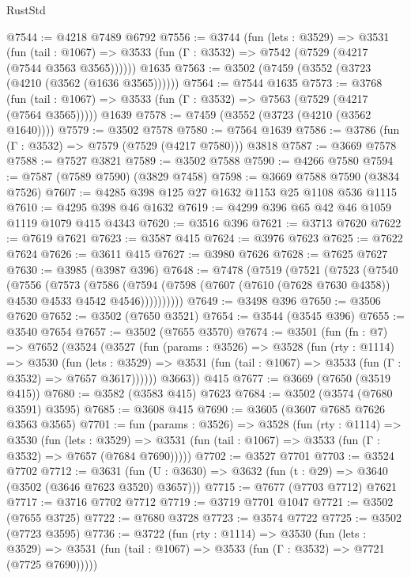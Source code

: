 \begin{lexlean}{RustStd}
\begin{coremodule}
@7544 := @4218 @7489 @6792
@7556 := @3744
    (fun (lets : @3529) =>
    @3531
      (fun (tail : @1067) => @3533 (fun (Γ : @3532) => @7542 (@7529 (@4217 (@7544 @3563 @3565))))))
    @1635
@7563 := @3502 (@7459 (@3552 (@3723 (@4210 (@3562 (@1636 @3565))))))
@7564 := @7544 @1635
@7573 := @3768
    (fun (tail : @1067) => @3533 (fun (Γ : @3532) => @7563 (@7529 (@4217 (@7564 @3565)))))
    @1639
@7578 := @7459 (@3552 (@3723 (@4210 (@3562 @1640))))
@7579 := @3502 @7578
@7580 := @7564 @1639
@7586 := @3786 (fun (Γ : @3532) => @7579 (@7529 (@4217 @7580))) @3818
@7587 := @3669 @7578
@7588 := @7527 @3821
@7589 := @3502 @7588
@7590 := @4266 @7580
@7594 := @7587 (@7589 @7590) (@3829 @7458)
@7598 := @3669 @7588 @7590 (@3834 @7526)
@7607 := @4285 @398 @125 @27 @1632 @1153 @25 @1108 @536 @1115
@7610 := @4295 @398 @46 @1632
@7619 := @4299 @396 @65 @42 @46 @1059 @1119 @1079 @415 @4343
@7620 := @3516 @396
@7621 := @3713 @7620
@7622 := @7619 @7621
@7623 := @3587 @415
@7624 := @3976 @7623
@7625 := @7622 @7624
@7626 := @3611 @415
@7627 := @3980 @7626
@7628 := @7625 @7627
@7630 := @3985 (@3987 @396)
@7648 := @7478
    (@7519
      (@7521
        (@7523
          (@7540
            (@7556
              (@7573
                (@7586
                  (@7594 (@7598 (@7607 (@7610 (@7628 @7630 @4358)) @4530 @4533 @4542 @4546))))))))))
@7649 := @3498 @396
@7650 := @3506 @7620
@7652 := @3502 (@7650 @3521)
@7654 := @3544 (@3545 @396)
@7655 := @3540 @7654
@7657 := @3502 (@7655 @3570)
@7674 := @3501
    (fun (fn : @7) =>
    @7652
      (@3524
        (@3527
          (fun (params : @3526) =>
          @3528
            (fun (rty : @1114) =>
            @3530
              (fun (lets : @3529) =>
              @3531 (fun (tail : @1067) => @3533 (fun (Γ : @3532) => @7657 @3617))))))
        @3663))
    @415
@7677 := @3669 (@7650 (@3519 @415))
@7680 := @3582 (@3583 @415) @7623
@7684 := @3502 (@3574 (@7680 @3591) @3595)
@7685 := @3608 @415
@7690 := @3605 (@3607 @7685 @7626 @3563 @3565)
@7701 := fun (params : @3526) =>
  @3528
    (fun (rty : @1114) =>
    @3530
      (fun (lets : @3529) =>
      @3531 (fun (tail : @1067) => @3533 (fun (Γ : @3532) => @7657 (@7684 @7690)))))
@7702 := @3527 @7701
@7703 := @3524 @7702
@7712 := @3631 (fun (U : @3630) => @3632 (fun (t : @29) => @3640 (@3502 (@3646 @7623 @3520) @3657)))
@7715 := @7677 (@7703 @7712) @7621
@7717 := @3716 @7702 @7712
@7719 := @3719 @7701 @1047
@7721 := @3502 (@7655 @3725)
@7722 := @7680 @3728
@7723 := @3574 @7722
@7725 := @3502 (@7723 @3595)
@7736 := @3722
    (fun (rty : @1114) =>
    @3530
      (fun (lets : @3529) =>
      @3531 (fun (tail : @1067) => @3533 (fun (Γ : @3532) => @7721 (@7725 @7690)))))

\end{coremodule}
\end{lexlean}
